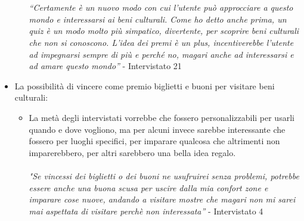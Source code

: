 \documentclass{article}
\begin{document}
\begin{itemize}
\begin{itemize}
\\\\
\textit{“Certamente è un nuovo modo con cui l’utente può approcciare a questo mondo e interessarsi ai beni culturali. Come ho detto anche prima, un quiz è un modo molto più simpatico, divertente, per scoprire beni culturali che non si conoscono. L’idea dei premi è un plus, incentiverebbe l’utente ad impegnarsi sempre di più e perché no, magari anche ad interessarsi e ad amare questo mondo”} - Intervistato 21
\end{itemize}
\item La possibilità di vincere come premio biglietti e buoni per visitare beni culturali:
\begin{itemize}
\item La metà degli intervistati vorrebbe che fossero personalizzabili per usarli quando e dove vogliono, ma per alcuni invece sarebbe interessante che fossero per luoghi specifici, per imparare qualcosa che altrimenti non imparerebbero, per altri sarebbero una bella idea regalo.
\\\\
\textit{"Se vincessi dei biglietti o dei buoni ne usufruirei senza problemi, potrebbe essere anche una buona scusa per uscire dalla mia confort zone e imparare cose nuove, andando a visitare mostre che magari non mi sarei mai aspettata di visitare perchè non interessata”} - Intervistato 4
\end{itemize}
\end{itemize}
\end{document}
